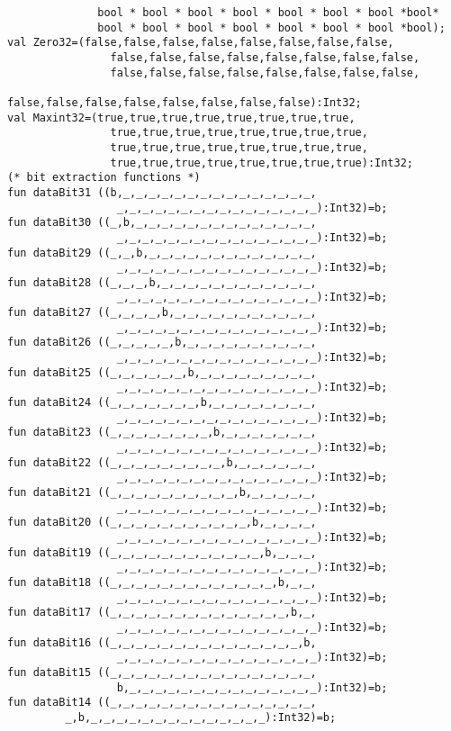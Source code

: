 \begin{verbatim}
              bool * bool * bool * bool * bool * bool * bool *bool*
              bool * bool * bool * bool * bool * bool * bool *bool);
val Zero32=(false,false,false,false,false,false,false,false,
                false,false,false,false,false,false,false,false,
                false,false,false,false,false,false,false,false,
                false,false,false,false,false,false,false,false):Int32;
val Maxint32=(true,true,true,true,true,true,true,true,
                true,true,true,true,true,true,true,true,
                true,true,true,true,true,true,true,true,
                true,true,true,true,true,true,true,true):Int32;
(* bit extraction functions *)
fun dataBit31 ((b,_,_,_,_,_,_,_,_,_,_,_,_,_,_,_,
                 _,_,_,_,_,_,_,_,_,_,_,_,_,_,_,_):Int32)=b;
fun dataBit30 ((_,b,_,_,_,_,_,_,_,_,_,_,_,_,_,_,
                 _,_,_,_,_,_,_,_,_,_,_,_,_,_,_,_):Int32)=b;
fun dataBit29 ((_,_,b,_,_,_,_,_,_,_,_,_,_,_,_,_,
                 _,_,_,_,_,_,_,_,_,_,_,_,_,_,_,_):Int32)=b;
fun dataBit28 ((_,_,_,b,_,_,_,_,_,_,_,_,_,_,_,_,
                 _,_,_,_,_,_,_,_,_,_,_,_,_,_,_,_):Int32)=b;
fun dataBit27 ((_,_,_,_,b,_,_,_,_,_,_,_,_,_,_,_,
                 _,_,_,_,_,_,_,_,_,_,_,_,_,_,_,_):Int32)=b;
fun dataBit26 ((_,_,_,_,_,b,_,_,_,_,_,_,_,_,_,_,
                 _,_,_,_,_,_,_,_,_,_,_,_,_,_,_,_):Int32)=b;
fun dataBit25 ((_,_,_,_,_,_,b,_,_,_,_,_,_,_,_,_,
                 _,_,_,_,_,_,_,_,_,_,_,_,_,_,_,_):Int32)=b;
fun dataBit24 ((_,_,_,_,_,_,_,b,_,_,_,_,_,_,_,_,
                 _,_,_,_,_,_,_,_,_,_,_,_,_,_,_,_):Int32)=b;
fun dataBit23 ((_,_,_,_,_,_,_,_,b,_,_,_,_,_,_,_,
                 _,_,_,_,_,_,_,_,_,_,_,_,_,_,_,_):Int32)=b;
fun dataBit22 ((_,_,_,_,_,_,_,_,_,b,_,_,_,_,_,_,
                 _,_,_,_,_,_,_,_,_,_,_,_,_,_,_,_):Int32)=b;
fun dataBit21 ((_,_,_,_,_,_,_,_,_,_,b,_,_,_,_,_,
                 _,_,_,_,_,_,_,_,_,_,_,_,_,_,_,_):Int32)=b;
fun dataBit20 ((_,_,_,_,_,_,_,_,_,_,_,b,_,_,_,_,
                 _,_,_,_,_,_,_,_,_,_,_,_,_,_,_,_):Int32)=b;
fun dataBit19 ((_,_,_,_,_,_,_,_,_,_,_,_,b,_,_,_,
                 _,_,_,_,_,_,_,_,_,_,_,_,_,_,_,_):Int32)=b;
fun dataBit18 ((_,_,_,_,_,_,_,_,_,_,_,_,_,b,_,_,
                 _,_,_,_,_,_,_,_,_,_,_,_,_,_,_,_):Int32)=b;
fun dataBit17 ((_,_,_,_,_,_,_,_,_,_,_,_,_,_,b,_,
                 _,_,_,_,_,_,_,_,_,_,_,_,_,_,_,_):Int32)=b;
fun dataBit16 ((_,_,_,_,_,_,_,_,_,_,_,_,_,_,_,b,
                 _,_,_,_,_,_,_,_,_,_,_,_,_,_,_,_):Int32)=b;
fun dataBit15 ((_,_,_,_,_,_,_,_,_,_,_,_,_,_,_,_,
                 b,_,_,_,_,_,_,_,_,_,_,_,_,_,_,_):Int32)=b;
fun dataBit14 ((_,_,_,_,_,_,_,_,_,_,_,_,_,_,_,_,
		 _,b,_,_,_,_,_,_,_,_,_,_,_,_,_,_):Int32)=b;

\end{verbatim}
